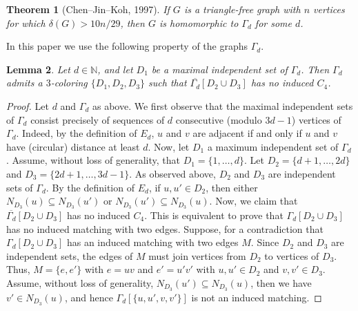 \documentclass[a4paper,12pt]{article}
\newtheorem{theorem}{Theorem}
\newtheorem{lemma}[theorem]{Lemma}
\newtheorem{proposition}[theorem]{Proposition}
\begin{document}
\begin{theorem}[Chen--Jin--Koh, 1997]\label{thm:ChenJinKoh}
	If \(G\) is a triangle-free graph with \(n\) vertices
	for which \(\delta(G) > 10n/29\),
	then \(G\) is homomorphic to \(\Gamma_d\) for some \(d\).
\end{theorem}

In this paper we use the following property of the graphs \(\Gamma_d\).




\begin{lemma}\label{lemma:andrasfai_coloring}
	Let \(d\in\mathbb{N}\),
	and let \(D_1\) be a maximal independent set of \(\Gamma_d\).
	Then \(\Gamma_d\) admits a \(3\)-coloring \(\{D_1,D_2,D_3\}\)
	such that \(\overline{\Gamma_d}[D_2\cup D_3]\) has no induced \(C_4\).
\end{lemma}

\begin{proof}
	Let \(d\) and \(\Gamma_d\) as above.
	We first observe that the maximal independent sets of \(\Gamma_d\)
	consist precisely of sequences of \(d\) consecutive (modulo \(3d-1\)) vertices of \(\Gamma_d\).
	Indeed,	by the definition of \(E_d\), \(u\) and \(v\) are adjacent 
	if and only if \(u\) and \(v\) have (circular) distance at least \(d\).
	Now, let \(D_1\) a maximum independent set of \(\Gamma_d\).
	Assume, without loss of generality, that \(D_1 = \{1,\ldots,d\}\).
	Let \(D_2 = \{d+1,\ldots,2d\}\) and \(D_3 = \{2d+1,\ldots, 3d-1\}\).
	As observed above, \(D_2\) and \(D_3\) are independent sets of \(\Gamma_d\).
	By the definition of \(E_d\), if \(u,u'\in D_2\),
	then either \(N_{D_3}(u) \subseteq N_{D_3}(u')\) or \(N_{D_3}(u') \subseteq N_{D_3}(u)\).
	Now, we claim that \(\overline{\Gamma_d}[D_2\cup D_3]\) has no induced \(C_4\).
	This is equivalent to prove that \(\Gamma_d[D_2\cup D_3]\) has no induced matching with two edges.
	Suppose, for a contradiction that \(\Gamma_d[D_2\cup D_3]\) has an induced matching with two edges \(M\).
	Since \(D_2\) and \(D_3\) are independent sets, the edges of \(M\) must join vertices from \(D_2\) to vertices of \(D_3\).
	Thus, \(M = \{e,e'\}\) with \(e = uv\) and \(e' = u'v'\) with \(u,u' \in D_2\) and \(v,v'\in D_3\).
	Assume, without loss of generality, \(N_{D_3}(u') \subseteq N_{D_3}(u)\),
	then we have \(v' \in N_{D_3}(u)\), and hence \(\Gamma_d[\{u,u',v,v'\}]\) is not an induced matching.
\end{proof}
\end{document}

